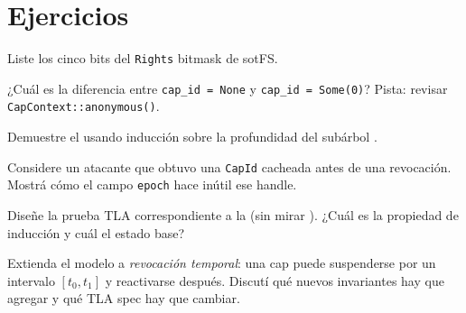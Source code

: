 \section*{Ejercicios}

\begin{ejercicio}[\dificultad{$\star$}]
\label{ej:cap-1}
Liste los cinco bits del \texttt{Rights} bitmask de sotFS.
\end{ejercicio}

\begin{ejercicio}[\dificultad{$\star$}]
\label{ej:cap-2}
¿Cuál es la diferencia entre \texttt{cap\_id = None} y \texttt{cap\_id
= Some(0)}? Pista: revisar \texttt{CapContext::anonymous()}.
\end{ejercicio}

\begin{ejercicio}[\dificultad{$\star\star$}]
\label{ej:cap-3}
Demuestre el  usando inducción sobre la
profundidad del subárbol \edelegates.
\end{ejercicio}

\begin{ejercicio}[\dificultad{$\star\star$}]
\label{ej:cap-4}
Considere un atacante que obtuvo una \texttt{CapId} cacheada antes de
una revocación. Mostrá cómo el campo \texttt{epoch} hace inútil ese
handle.
\end{ejercicio}

\begin{ejercicio}[\dificultad{$\star\star$}]
\label{ej:cap-5}
Diseñe la prueba TLA correspondiente a la  (sin
mirar ). ¿Cuál es la propiedad de
inducción y cuál el estado base?
\end{ejercicio}

\begin{ejercicio}[\dificultad{$\star\star\star$}]
\label{ej:cap-6}
Extienda el modelo a \emph{revocación temporal}: una cap puede
suspenderse por un intervalo $[t_0, t_1]$ y reactivarse después.
Discutí qué nuevos invariantes hay que agregar y qué TLA spec hay que
cambiar.
\end{ejercicio}
